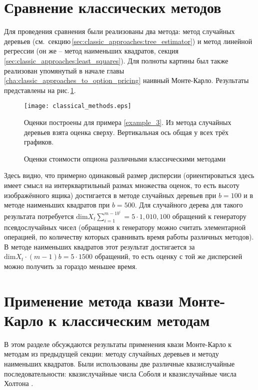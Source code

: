 \section{Сравнение классических методов} %
\label{sec:results:classical_approaches}

Для проведения сравнения были реализованы два метода: метод случайных деревьев (см.~секцию\,\ref{sec:classic_approaches:tree_estimator}) и метод линейной регрессии (он же -- метод наименьших квадратов, секция\,\ref{sec:classic_approaches:least_squares}). Для полноты картины был также реализован упомянутый в начале главы \ref{cha:classic_approaches_to_option_pricing} наивный Монте-Карло. Результаты представлены на рис.\,\ref{fig:classical_methods}.

\begin{figure}[h]
    \centering
    \texttt{[image: classical\_methods.eps]}
    \caption{Оценки стоимости опциона различными классическими методами}
    \footnotesize Оценки построены для примера \ref{example_3}. Из метода случайных деревьев взята оценка сверху. Вертикальная ось общая у всех трёх графиков.
    \label{fig:classical_methods}
\end{figure}

Здесь видно, что примерно одинаковый размер дисперсии (ориентироваться здесь имеет смысл на интерквартильный размах множества оценок, то есть высоту изображённого ящика) достигается в методе случайных деревьев при $b=100$ и в методе наименьших квадратов при $b=500$. Для случайного дерева для такого результата потребуется $\mathrm{dim} X_t \sum_{i=1}^{m-1 b^i} = 5 \cdot {1,010,100}$ обращений к генератору псевдослучайных чисел (обращения к генератору можно считать элементарной операцией, по количеству которых сравнивать время работы различных методов). В методе наименьших квадратов этот результат достигается за $\mathrm{dim} X_t \cdot (m-1)b = 5 \cdot 1500$ обращений, то есть оценку с той же дисперсией можно получить за гораздо меньшее время.


\section{Применение метода квази Монте-Карло к классическим методам} %
\label{sec:results:qmc_to_classical_methods}

В этом разделе обсуждаются результаты применения квази Монте-Карло к методам из предыдущей секции: методу случайных деревьев и методу наименьших квадратов. Были использованы две различные квазислучайные последовательности: квазислучайные числа Соболя \cite{NIEDERREITER198851} и квазислучайные числа Холтона \cite{Faure2009}.

